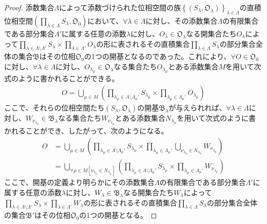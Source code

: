 \documentclass[dvipdfmx]{jsarticle}
\begin{document}
\begin{proof}
添数集合$\varLambda$によって添数づけられた位相空間の族$\left\{ \left( S_{\lambda},\mathfrak{O}_{\lambda} \right) \right\}_{\lambda \in \varLambda}$の直積位相空間$\left( \prod_{\lambda \in \varLambda} S_{\lambda},\mathfrak{O}_{0} \right)$において、$\forall\lambda \in \varLambda$に対し、その添数集合$\varLambda$の有限集合である部分集合$\varLambda'$に属する任意の添数$\lambda$に対し、$O_{\lambda} \in \mathfrak{O}_{\lambda}$なる開集合たち$O_{\lambda}$によって$\prod_{\lambda \in \varLambda \setminus \varLambda'} S_{\lambda} \times \prod_{\lambda \in \varLambda'} O_{\lambda}$の形に表されるその直積集合$\prod_{\lambda \in \varLambda} S_{\lambda}$の部分集合全体の集合$\mathfrak{B}$はその位相$\mathfrak{O}_{0}$の1つの開基となるのであった。これにより、$\forall O \in \mathfrak{O}_{0}$に対し、$\forall\lambda \in \varLambda$に対し、$O_{\lambda_{\mu}} \in \mathfrak{O}_{\lambda}$なる集合たち$O_{\lambda_{\mu}}$とある添数集合$M$を用いて次式のように書かれることができる。
\begin{align*}
O = \bigcup_{\mu \in M} \left( \prod_{\lambda_{\mu} \in \varLambda \setminus \varLambda_{\mu}'} S_{\lambda_{\mu}} \times \prod_{\lambda_{\mu} \in \varLambda_{\mu}'} O_{\lambda_{\mu}} \right)
\end{align*}
ここで、それらの位相空間たち$\left( S_{\lambda},\mathfrak{O}_{\lambda} \right)$の開基$\mathfrak{B}_{\lambda}$が与えられれば、$\forall\lambda \in \varLambda$に対し、$W_{\nu_{\lambda_{\mu}}} \in \mathfrak{B}_{\lambda}$なる集合たち$W_{\nu_{\lambda_{\mu}}}$とある添数集合$N_{\lambda_{\mu}}$を用いて次式のように書かれることができ、したがって、次のようになる。
\begin{align*}
O &= \bigcup_{\mu \in M} \left( \prod_{\lambda_{\mu} \in \varLambda \setminus \varLambda_{\mu}'} S_{\lambda_{\mu}} \times \prod_{\lambda_{\mu} \in \varLambda_{\mu}'} {\bigcup_{\nu_{\lambda_{\mu}} \in N_{\lambda_{\mu}}} W_{\nu_{\lambda_{\mu}}}} \right)\\
&= \bigcup_{\forall\mu \in M\left[ \nu_{\lambda_{\mu}} \in N_{\lambda_{\mu}} \right]} \left( \prod_{\lambda_{\mu} \in \varLambda \setminus \varLambda_{\mu}'} S_{\lambda_{\mu}} \times \prod_{\lambda_{\mu} \in \varLambda_{\mu}'} W_{\nu_{\lambda_{\mu}}} \right)
\end{align*}
ここで、開基の定義より明らかにその添数集合$\varLambda$の有限集合である部分集合$\varLambda'$に属する任意の添数$\lambda$に対し、$W_{\lambda} \in \mathfrak{B}_{\lambda}$なる開集合たち$W_{\lambda}$によって$\prod_{\lambda \in \varLambda \setminus \varLambda'} S_{\lambda} \times \prod_{\lambda \in \varLambda'} W_{\lambda}$の形に表されるその直積集合$\prod_{\lambda \in \varLambda} S_{\lambda}$の部分集合全体の集合$\mathfrak{B}'$はその位相$\mathfrak{O}_{0}$の1つの開基となる。
\end{proof}
\end{document}
